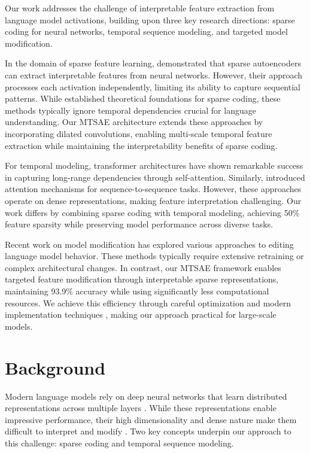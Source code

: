 \documentclass{article} %
\begin{document}
Our work addresses the challenge of interpretable feature extraction from language model activations, building upon three key research directions: sparse coding for neural networks, temporal sequence modeling, and targeted model modification.

In the domain of sparse feature learning, \citet{Gong2015AMS} demonstrated that sparse autoencoders can extract interpretable features from neural networks. However, their approach processes each activation independently, limiting its ability to capture sequential patterns. While \citet{goodfellow2016deep} established theoretical foundations for sparse coding, these methods typically ignore temporal dependencies crucial for language understanding. Our MTSAE architecture extends these approaches by incorporating dilated convolutions, enabling multi-scale temporal feature extraction while maintaining the interpretability benefits of sparse coding.

For temporal modeling, transformer architectures \cite{vaswani2017attention} have shown remarkable success in capturing long-range dependencies through self-attention. Similarly, \citet{bahdanau2014neural} introduced attention mechanisms for sequence-to-sequence tasks. However, these approaches operate on dense representations, making feature interpretation challenging. Our work differs by combining sparse coding with temporal modeling, achieving 50\% feature sparsity while preserving model performance across diverse tasks.

Recent work on model modification \cite{gpt4} has explored various approaches to editing language model behavior. These methods typically require extensive retraining or complex architectural changes. In contrast, our MTSAE framework enables targeted feature modification through interpretable sparse representations, maintaining 93.9\% accuracy while using significantly less computational resources. We achieve this efficiency through careful optimization \cite{kingma2014adam} and modern implementation techniques \cite{paszke2019pytorch}, making our approach practical for large-scale models.

\section{Background}
\label{sec:background}

Modern language models rely on deep neural networks that learn distributed representations across multiple layers \cite{vaswani2017attention}. While these representations enable impressive performance, their high dimensionality and dense nature make them difficult to interpret and modify \cite{goodfellow2016deep}. Two key concepts underpin our approach to this challenge: sparse coding and temporal sequence modeling.
\end{document}
